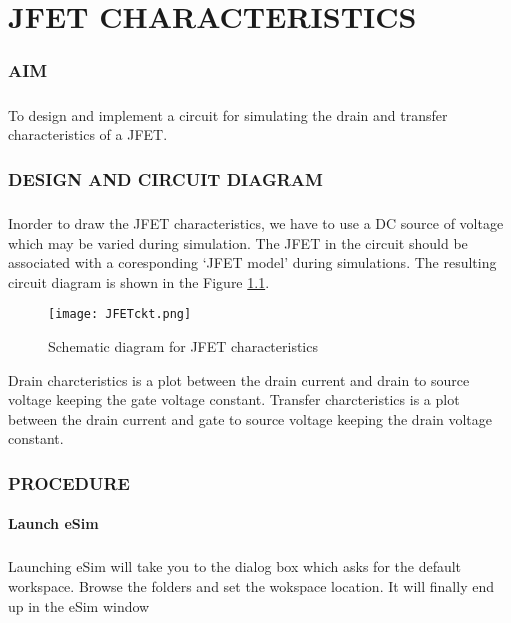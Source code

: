\chapter{JFET CHARACTERISTICS}

\subsection*{AIM}
\paragraph{}To design and implement a circuit for simulating the drain and transfer characteristics of a JFET.

\subsection*{DESIGN AND CIRCUIT DIAGRAM}
\paragraph{}

Inorder to draw the JFET characteristics, we have to use a DC source of voltage which may be varied during simulation. The JFET in the circuit should be associated with a coresponding `JFET model' during  simulations. The resulting circuit diagram is shown in the Figure \ref{JFETckt}.
\begin{figure}[h]
\centering
\texttt{[image: JFETckt.png]}
\caption{Schematic diagram for JFET characteristics}
\label{JFETckt}
\end{figure}

Drain charcteristics is a plot between the drain current and drain to source voltage keeping the gate voltage constant. Transfer charcteristics is a plot between the drain current and gate to source voltage keeping the drain voltage constant.

\subsection*{PROCEDURE}

\subsubsection{Launch eSim}

\paragraph{}
 Launching eSim will take you to the dialog box which asks for the default workspace. Browse the folders and set the wokspace location. It will finally end up in the eSim window %


